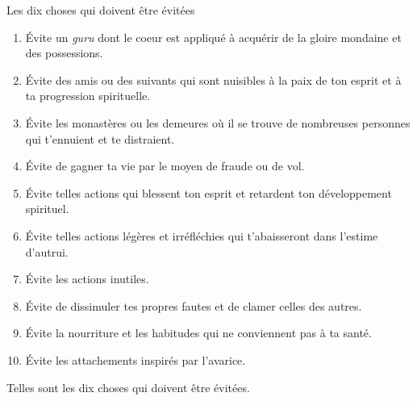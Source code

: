 \documentclass[10pt]{book}
\makeatletter
\renewcommand{\section}{\@startsection{section}{0}{0mm}
   {\baselineskip}
   {\baselineskip}{\normalfont\normalsize\scshape\centering}
}
\makeatother
\begin{document}
\section{Les dix choses qui doivent être évitées}
\begin{enumerate}[1.-]
\item Évite un \textit{guru} dont le coeur est appliqué à acquérir de la gloire mondaine et des possessions.
\item Évite des amis ou des suivants qui sont nuisibles à la paix de ton esprit et à ta progression spirituelle.
\item Évite les monastères ou les demeures où il se trouve de nombreuses personnes qui t'ennuient et te distraient.
\item Évite de gagner ta vie par le moyen de fraude ou de vol.
\item Évite telles actions qui blessent ton esprit et retardent ton développement spirituel.
\item Évite telles actions légères et irréfléchies qui t'abaisseront dans l'estime d'autrui.
\item Évite les actions inutiles.
\item Évite de dissimuler tes propres fautes et de clamer celles des autres.
\item Évite la nourriture et les habitudes qui ne conviennent pas à ta santé.
\item Évite les attachements inspirés par l'avarice.
\end{enumerate}
Telles sont les dix choses qui doivent être évitées.
\end{document}
